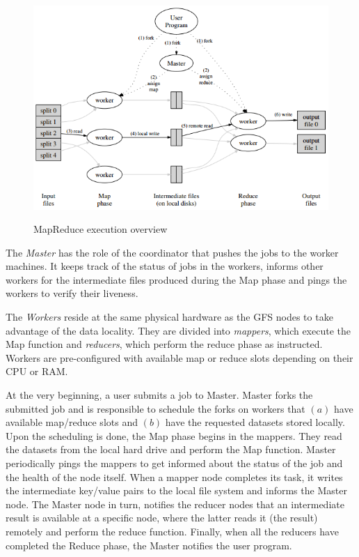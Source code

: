 \begin{figure}
\centering
\includegraphics[scale=0.8]{resources/images/Background/mapreduce_exec_overview.png}
\label{fig:mapreduce_execution_overview}
\caption{MapReduce execution overview \cite{Dean:2004:MSD:1251254.1251264}}
\end{figure}

The \emph{Master} has the role of the coordinator that pushes the jobs
to the worker machines. It keeps track of the status of jobs in the
workers, informs other workers for the intermediate files produced
during the Map phase and pings the workers to verify their liveness.

The \emph{Workers} reside at the same physical hardware as the GFS
nodes to take advantage of the data locality. They are divided into
\emph{mappers}, which execute the Map function and \emph{reducers},
which perform the reduce phase as instructed. Workers are
pre-configured with available map or reduce slots depending on their
CPU or RAM.

At the very beginning, a user submits a job to Master. Master forks
the submitted job and is responsible to schedule the forks on workers
that $(a)$ have available map/reduce slots and $(b)$ have the
requested datasets stored locally. Upon the scheduling is done, the
Map phase begins in the mappers. They read the datasets from the local
hard drive and perform the Map function. Master periodically pings the
mappers to get informed about the status of the job and the health of
the node itself. When a mapper node completes its task, it writes the
intermediate key/value pairs to the local file system and informs the
Master node. The Master node in turn, notifies the reducer nodes that
an intermediate result is available at a specific node, where the
latter reads it (the result) remotely and perform the reduce
function. Finally, when all the reducers have completed the Reduce
phase, the Master notifies the user program.

